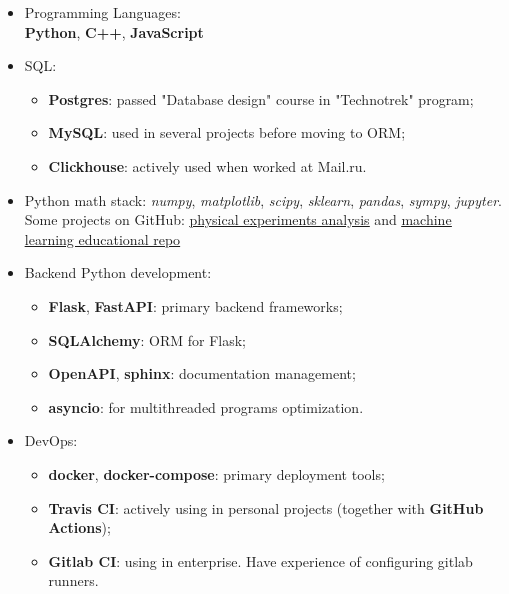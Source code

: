 \begin{itemize}
	\item Programming Languages: \\ 
        \textbf{Python}, \textbf{C++}, \textbf{JavaScript}
    \item SQL: 
        \begin{itemize}
            \item \textbf{Postgres}: passed "Database design" course in "Technotrek" program;
            \item \textbf{MySQL}: used in several projects before moving to ORM;
            \item \textbf{Clickhouse}: actively used when worked at Mail.ru.
        \end{itemize}
    \item Python math stack: \textit{numpy}, \textit{matplotlib}, \textit{scipy}, \textit{sklearn}, \textit{pandas}, \textit{sympy}, \textit{jupyter}. 
    Some projects on GitHub: \href{https://github.com/alekseik1/phys\_labs}{\underline{physical experiments analysis}} and \href{https://github.com/alekseik1/machine\_learning\_coursera}{\underline{machine learning educational repo}}
    \item Backend Python development: 
        \begin{itemize}
            \item \textbf{Flask}, \textbf{FastAPI}: primary backend frameworks;
            \item \textbf{SQLAlchemy}: ORM for Flask;
            \item \textbf{OpenAPI}, \textbf{sphinx}: documentation management;
            \item \textbf{asyncio}: for multithreaded programs optimization.
        \end{itemize}
    \item DevOps: 
        \begin{itemize}
            \item \textbf{docker}, \textbf{docker-compose}: primary deployment tools;
            \item \textbf{Travis CI}: actively using in personal projects (together with \textbf{GitHub Actions});
            \item \textbf{Gitlab CI}: using in enterprise.
                Have experience of configuring gitlab runners.
        \end{itemize}
\end{itemize}

